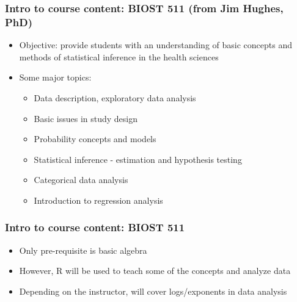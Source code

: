 \documentclass[12pt]{beamer}
\newcommand{\myframe}[1]{\begin{frame} \frametitle{#1}}
\newenvironment{spaceitemize}
{ \begin{itemize}
    \setlength{\itemsep}{10pt}
    \setlength{\parskip}{0pt}
    \setlength{\parsep}{0pt}     }
{ \end{itemize}                  }
\begin{document}
\myframe{Intro to course content: BIOST 511 \small (from Jim Hughes, PhD)}
\begin{spaceitemize}
\item Objective: provide students with an understanding of basic concepts and methods of statistical inference in the health sciences
\item Some major topics:
\begin{spaceitemize}
\item Data description, exploratory data analysis
\item Basic issues in study design
\item Probability concepts and models
\item Statistical inference - estimation and hypothesis testing
\item Categorical data analysis
\item Introduction to regression analysis
\end{spaceitemize}
\end{spaceitemize}
\end{frame}

\myframe{Intro to course content: BIOST 511}
\begin{spaceitemize}
\item Only pre-requisite is basic algebra
\item However, R will be used to teach some of the concepts and analyze data
\item Depending on the instructor, will cover logs/exponents in data analysis
\end{spaceitemize}
\end{frame}
\end{document}
